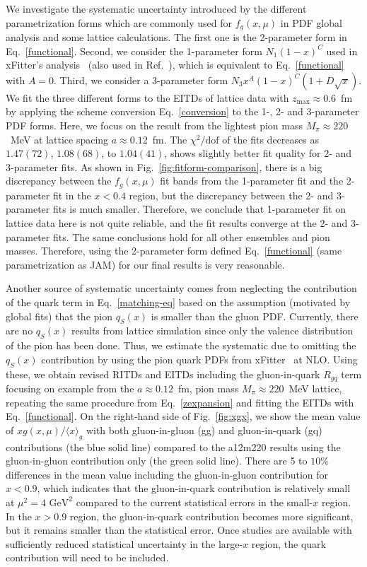We investigate the systematic uncertainty introduced by the different parametrization forms which are commonly used for $f_g(x,\mu)$ in PDF global analysis and some lattice calculations.
The first one is the 2-parameter form in Eq.~\ref{functional}.
Second, we consider the 1-parameter form $N_1 (1-x)^C$ used in xFitter's analysis~\cite{Novikov:2020snp} (also used in Ref.~\cite{Aurenche:1989sx,Sutton:1991ay}), which is equivalent to Eq.~\ref{functional} with $A=0$.
Third, we consider a 3-parameter form $N_3 x^A(1-x)^C(1+D\sqrt{x})$.
We fit the three different forms to the EITDs of lattice data with $z_\text{max}\approx 0.6$~fm by applying the scheme conversion Eq.~\ref{conversion} to the 1-, 2- and 3-parameter PDF forms.
Here, we focus on the result from the lightest pion mass $M_{\pi}\approx 220$~MeV at lattice spacing $a\approx 0.12$~fm.
The $\chi^2/\text{dof}$ of the fits decreases as $1.47(72)$, $1.08(68)$, to $1.04(41)$, shows slightly better fit quality for 2- and 3-parameter fits.
As shown in Fig.~\ref{fig:fitform-comparison}, there is a big discrepancy between the $f_g(x,\mu)$ fit bands from the 1-parameter fit and the 2-parameter fit in the $x<0.4$ region, but the discrepancy between the 2- and 3-parameter fits is much smaller.
Therefore, we conclude that 1-parameter fit on lattice data here is not quite reliable, and the fit results converge at the 2- and 3-parameter fits.
The same conclusions hold for all other ensembles and pion masses.
Therefore, using the 2-parameter form defined Eq.~\ref{functional} (same parametrization as JAM) for our final results is very reasonable.


Another source of systematic uncertainty comes from neglecting the contribution of the quark term in Eq.~\ref{matching-eq} based on the assumption (motivated by global fits) that the pion $q_S(x)$ is smaller than the gluon PDF.
Currently, there are no $q_S(x)$ results from lattice simulation since only the valence distribution of the pion has been done.
Thus, we estimate the systematic due to omitting the $q_S(x)$ contribution by using the pion quark PDFs from xFitter~\cite{Novikov:2020snp} at NLO.
Using these, we obtain revised RITDs and EITDs including the gluon-in-quark $R_{gq}$ term focusing on example from the $a\approx 0.12$~fm, pion mass $M_\pi\approx 220$~MeV lattice, repeating the same procedure from Eq.~\ref{zexpansion} and fitting the EITDs with Eq.~\ref{functional}.
On the right-hand side of Fig.~\ref{fig:xgx}, we show the mean value of $xg(x, \mu)/\langle x \rangle_g$ with both gluon-in-gluon (gg) and gluon-in-quark (gq) contributions (the blue solid line) compared to the a12m220 results using the gluon-in-gluon contribution only (the green solid line).
There are 5 to $10\%$ differences in the mean value including the gluon-in-gluon contribution for $x<0.9$, which indicates that the gluon-in-quark contribution is relatively small at $\mu^2=4\text{ GeV}^2$ compared to the current statistical errors in the small-$x$ region.
In the $x>0.9$ region, the gluon-in-quark contribution becomes more significant, but it remains smaller than the statistical error.
Once studies are available with sufficiently reduced statistical uncertainty in the large-$x$ region, the quark contribution will need to be included.

